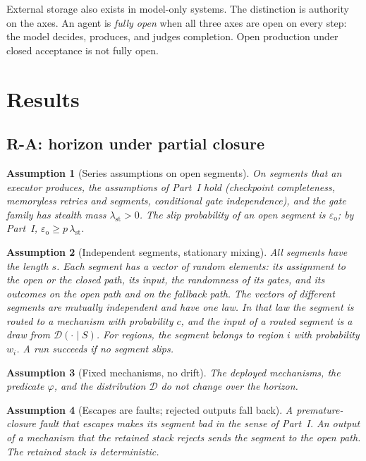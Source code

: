 \documentclass[11pt]{article}
\newtheorem{assumption}{Assumption}
\theoremstyle{definition}
\theoremstyle{remark}
\newcommand{\lst}{\lambda_{\mathrm{st}}}
\newcommand{\eop}{\varepsilon_{\mathrm{o}}}
\newcommand{\D}{\mathcal{D}}
\begin{document}
External storage also exists in model-only systems.
The distinction is authority on the axes.
An agent is \emph{fully open} when all three axes are open on every step: the model decides,
produces, and judges completion. Open production under closed acceptance is not fully open.

\section{Results}\label{sec:results}

\subsection{R-A: horizon under partial closure}\label{sec:ra}
\begin{assumption}[Series assumptions on open segments]\label{ass:series}
On segments that an executor produces, the assumptions of Part~I hold (checkpoint completeness,
memoryless retries and segments, conditional gate independence), and the gate family has stealth mass
$\lst>0$. The slip probability of an open segment is $\eop$; by Part~I, $\eop\ge p\,\lst$.
\end{assumption}

\begin{assumption}[Independent segments, stationary mixing]\label{ass:mixing}
All segments have the length $s$. Each segment has a vector of random elements: its assignment to the
open or the closed path, its input, the randomness of its gates, and its outcomes on the open path
and on the fallback path. The vectors of different segments are mutually independent and have one
law. In that law the segment is routed to a mechanism with probability $c$, and the input of a routed segment is a
draw from $\D(\cdot\mid S)$. For regions, the segment belongs to region $i$ with probability $w_i$.
A run succeeds if no segment slips.
\end{assumption}

\begin{assumption}[Fixed mechanisms, no drift]\label{ass:nodrift}
The deployed mechanisms, the predicate $\varphi$, and the distribution $\D$ do not change over the
horizon.
\end{assumption}

\begin{assumption}[Escapes are faults; rejected outputs fall back]\label{ass:fallback}
A premature-closure fault that escapes makes its segment bad in the sense of Part~I. An output of a
mechanism that the retained stack rejects sends the segment to the open path. The retained stack is
deterministic.
\end{assumption}
\end{document}
